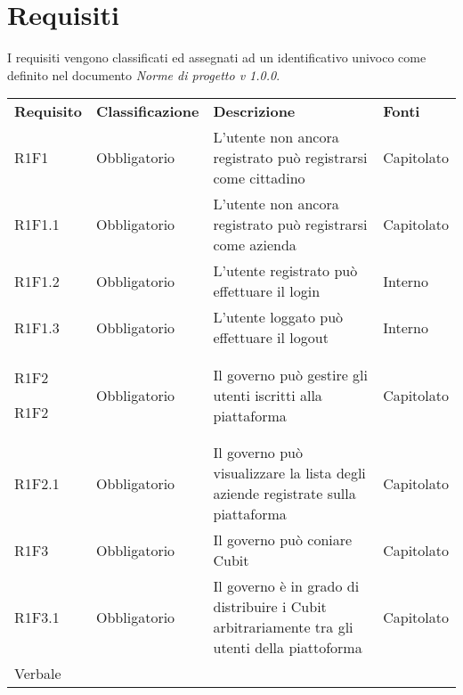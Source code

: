 
\section{Requisiti} 
I requisiti vengono classificati ed assegnati ad un identificativo  univoco come definito nel documento \textit{Norme di progetto v 1.0.0}.
\renewcommand{\arraystretch}{1.5}
\begin{center}
	
	\begin{longtable}{ >{\centering}p{} >{\centering}p{}
			>{\raggedright}p{} >{\centering}p{}}
		
		\rowcolorhead 
		\textbf{\color{white}Requisito} 
		& \textbf{\color{white}Classificazione} 
		& \centering\textbf{\color{white}Descrizione}
		& \textbf{\color{white}Fonti} 
		\tabularnewline 	
		
		R1F1 & Obbligatorio & L'utente non ancora registrato può registrarsi come cittadino 
		& Capitolato
		\tabularnewline
		R1F1.1 & Obbligatorio & L'utente non ancora registrato può registrarsi come azienda 
		& Capitolato
		\tabularnewline
		R1F1.2 & Obbligatorio & L'utente registrato può effettuare il login &
		Interno
		\tabularnewline
		R1F1.3 & Obbligatorio & L'utente loggato può effettuare il logout & Interno
		\tabularnewline
		R1F2
	
		R1F2 & Obbligatorio & Il governo può gestire gli utenti iscritti alla piattaforma  & Capitolato
		\tabularnewline
		R1F2.1 & Obbligatorio & Il governo può visualizzare la lista degli aziende registrate sulla piattaforma & Capitolato
		\tabularnewline
		R1F3 & Obbligatorio & Il governo può coniare Cubit & Capitolato 
		\tabularnewline 
		R1F3.1 & Obbligatorio & Il governo è in grado di distribuire i Cubit arbitrariamente tra gli utenti della piattoforma & Capitolato \\ Verbale
		\tabularnewline
	
		
		
		
	\end{longtable}
\end{center}

